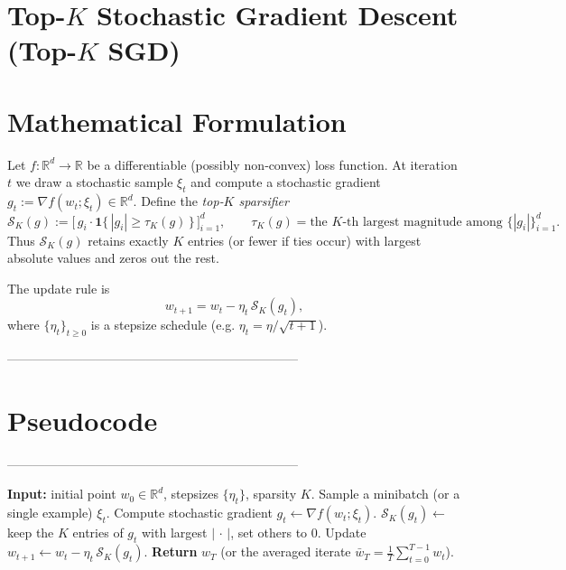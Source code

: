 \documentclass{article}
\newcommand{\RR}{\mathbb{R}}
\newcommand{\topk}[1]{\mathcal{S}_K(#1)}
\begin{document}
\section*{Top-$K$ Stochastic Gradient Descent (Top-$K$ SGD)}

\section*{Mathematical Formulation}
Let $f:\RR^{d}\to\RR$ be a differentiable (possibly non‑convex) loss function.
At iteration $t$ we draw a stochastic sample $\xi_t$ and compute a stochastic
gradient $g_t:=\nabla f(w_t;\xi_t)\in\RR^{d}$.
Define the \emph{top‑$K$ sparsifier}
\[
\topk{g}:= \bigl[\,g_i\cdot\mathbf 1\{\,|g_i|\ge \tau_K(g)\,\}\,\bigr]_{i=1}^{d},
\qquad 
\tau_K(g)=\text{the $K$‑th largest magnitude among }\{|g_i|\}_{i=1}^{d}.
\]
Thus $\topk{g}$ retains exactly $K$ entries (or fewer if ties occur) with
largest absolute values and zeros out the rest.

The update rule is
\begin{equation}\label{eq:update}
w_{t+1}= w_t - \eta_t \,\topk{g_t},
\end{equation}
where $\{\eta_t\}_{t\ge 0}$ is a stepsize schedule (e.g. $\eta_t=\eta/\sqrt{t+1}$).

---------------------------------------------------------------------
\section*{Pseudocode}
---------------------------------------------------------------------

\begin{algorithm}[H]
\caption{Top-$K$ SGD}
\begin{algorithmic}[1]
\State \textbf{Input:} initial point $w_0\in\RR^{d}$, stepsizes $\{\eta_t\}$, sparsity $K$.
    \State Sample a minibatch (or a single example) $\xi_t$.
    \State Compute stochastic gradient $g_t \gets \nabla f(w_t;\xi_t)$.
    \State $\displaystyle \topk{g_t}\gets$ keep the $K$ entries of $g_t$ with largest $|\,\cdot\,|$, set others to $0$.
    \State Update $w_{t+1}\gets w_t - \eta_t\,\topk{g_t}$.
\EndFor
\State \textbf{Return} $w_T$ (or the averaged iterate $\bar w_T=\frac1T\sum_{t=0}^{T-1}w_t$).
\end{algorithmic}
\end{algorithm}
\end{document}
